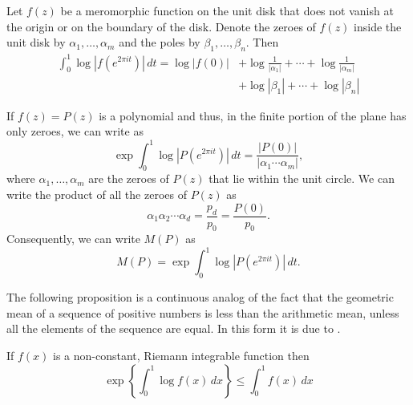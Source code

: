 \begin{proposition}[Jensen]
\label{Jensen:Formula:Prop}
Let $f(z)$ be a meromorphic function on the unit disk that does not vanish
at the origin or on the boundary of the disk.  Denote the zeroes of $f(z)$
inside the unit disk by $\alpha_{1}, \ldots, \alpha_{m}$ and the
poles by $\beta_{1}, \ldots, \beta_{n}$.  Then
\begin{equation}
\label{Jensen:Formula:Eq}
\begin{aligned}
\int_{0}^{1} \log \left|f(e^{2\pi i t})\right|\,dt = 
\log |f(0)| &+ \log \frac{1}{|\alpha_{1}|} + \cdots + 
                \log \frac{1}{|\alpha_{m}|} \\
       & + \log |\beta_{1}| + \cdots + \log |\beta_{n}|
\end{aligned}
\end{equation}
\end{proposition}

If $f(z) = P(z)$ is a polynomial and thus, in the finite portion of the 
plane has only zeroes, we can
write
 as
\begin{equation}
\label{Jensen:Formula:a:Eq}
\exp \int_{0}^{1} \log \left| P(e^{2\pi i t})\right| \, dt =
\frac{|P(0)|}{\left| \alpha_{1} \cdots \alpha_{m}\right|},
\end{equation}
where $\alpha_{1}, \ldots, \alpha_{m}$ are the zeroes of $P(z)$ that lie
within the unit circle.  We can write the product of all the zeroes
of $P(z)$ as
\[
\alpha_1 \alpha_2 \cdots \alpha_d = \frac{p_d}{p_0} =
\frac{P(0)}{p_0}.
\]
Consequently, we can write $M(P)$ as
\begin{equation} \label{PB:MPDef:Eq}
M(P) = \exp \int_{0}^{1} \log \left| P(e^{2\pi i t})\right| \, dt.
\end{equation}

The following proposition is a continuous analog of the fact that the
geometric mean of a sequence of positive numbers is less than the
arithmetic mean, unless all the elements of the sequence are equal.
In this form it is due to {\Jensen} \cite{Jensen06}.

\begin{proposition}[Jensen]
\label{Jensen:Inequality:Prop}
If $f(x)$ is a non-constant, Riemann integrable function then
\[
\exp \left\{ \int_0^1 \log f(x)\, dx\right\} \le \int_0^1 f(x) \, dx
\]
\end{proposition}

